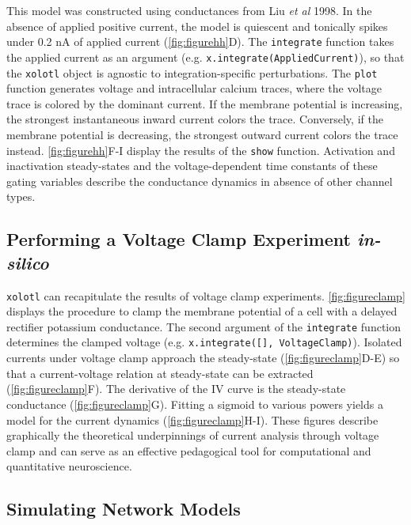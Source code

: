 \documentclass[utf8]{frontiersSCNS} %
\begin{document}
This model was constructed using conductances from Liu \textit{et al} 1998. In the absence of applied positive current, the model is quiescent and tonically spikes under 0.2 nA of applied current (\ref{fig:figurehh}D). The \texttt{integrate} function takes the applied current as an argument (e.g. \texttt{x.integrate(AppliedCurrent)}), so that the \texttt{xolotl} object is agnostic to integration-specific perturbations. The \texttt{plot} function generates voltage and intracellular calcium traces, where the voltage trace is colored by the dominant current. If the membrane potential is increasing, the strongest instantaneous inward current colors the trace. Conversely, if the membrane potential is decreasing, the strongest outward current colors the trace instead. \ref{fig:figurehh}F-I display the results of the \texttt{show} function. Activation and inactivation steady-states and the voltage-dependent time constants of these gating variables describe the conductance dynamics in absence of other channel types.

\subsection{Performing a Voltage Clamp Experiment \textit{in-silico}}

\texttt{xolotl} can recapitulate the results of voltage clamp experiments. \ref{fig:figureclamp} displays the procedure to clamp the membrane potential of a cell with a delayed rectifier potassium conductance. The second argument of the \texttt{integrate} function determines the clamped voltage (e.g. \texttt{x.integrate([], VoltageClamp)}). Isolated currents under voltage clamp approach the steady-state (\ref{fig:figureclamp}D-E) so that a current-voltage relation at steady-state can be extracted (\ref{fig:figureclamp}F). The derivative of the IV curve is the steady-state conductance (\ref{fig:figureclamp}G). Fitting a sigmoid to various powers yields a model for the current dynamics (\ref{fig:figureclamp}H-I). These figures describe graphically the theoretical underpinnings of current analysis through voltage clamp and can serve as an effective pedagogical tool for computational and quantitative neuroscience.

\subsection{Simulating Network Models}
\end{document}
